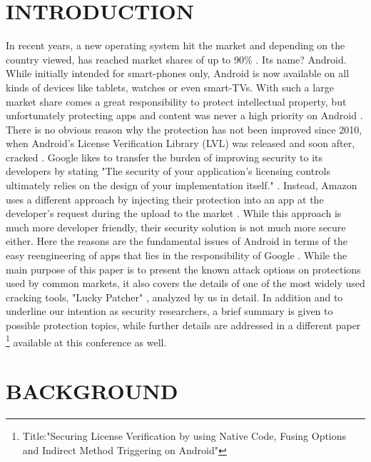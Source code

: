 \documentclass{sig-alternate}
\begin{document}





\section{INTRODUCTION}

In recent years, a new operating system hit the market and depending on the country viewed, has reached market shares of up to 90\% \cite{AT2}. Its name? Android. While initially intended for smart-phones only, Android is now available on all kinds of devices like tablets, watches or even smart-TVs. With such a large market share comes a great responsibility to protect intellectual property, but unfortunately protecting apps and content was never a high priority on Android \cite{nils}. There is no obvious reason why the protection has not been improved since 2010, when Android's License Verification Library (LVL) was released and soon after, cracked \cite{AT1}. Google likes to transfer the burden of improving security to its developers by stating "The security of your application's licensing controls ultimately relies on the design of your implementation itself." \cite{lvlOverview}. Instead, Amazon uses a different approach by injecting their protection into an app at the developer's request during the upload to the market \cite{AT3}. While this approach is much more developer friendly, their security solution is not much more secure either. Here the reasons are the fundamental issues of Android in terms of the easy reengineering of apps that lies in the responsibility of Google \cite{nils}.
While the main purpose of this paper is to present the known attack options on protections used by common markets, it also covers the details of one of the most widely used cracking tools, "Lucky Patcher" \cite{luckypatcherPage}, analyzed by us in detail. In addition and to underline our intention as security researchers, a brief summary is given to possible protection topics, while further details are addressed in a different paper \footnote{Title:"Securing License Verification by using Native Code, Fusing Options and Indirect Method Triggering on Android"} available at this conference as well.

\section{BACKGROUND}
\end{document}
